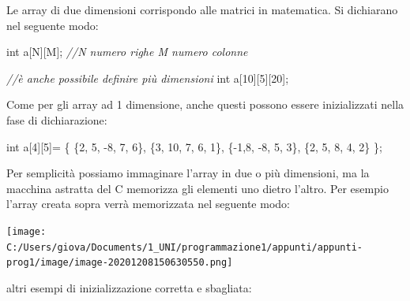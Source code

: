 \documentclass[
  paper=a4,
  oneside  ,captions=tableheading
]{scrbook}
\newenvironment{Shaded}{}{}
\newcommand{\CommentTok}[1]{\textcolor[rgb]{0.38,0.63,0.69}{\textit{#1}}}
\newcommand{\DataTypeTok}[1]{\textcolor[rgb]{0.56,0.13,0.00}{#1}}
\newcommand{\DecValTok}[1]{\textcolor[rgb]{0.25,0.63,0.44}{#1}}
\newcommand{\NormalTok}[1]{#1}
\begin{document}
Le array di due dimensioni corrispondo alle matrici in matematica. Si
dichiarano nel seguente modo:

\begin{Shaded}
\begin{Highlighting}[]
\DataTypeTok{int}\NormalTok{ a[N][M]; }\CommentTok{//N numero righe M numero colonne}

\CommentTok{//è anche possibile definire più dimensioni}
\DataTypeTok{int}\NormalTok{ a[}\DecValTok{10}\NormalTok{][}\DecValTok{5}\NormalTok{][}\DecValTok{20}\NormalTok{];}
\end{Highlighting}
\end{Shaded}

Come per gli array ad 1 dimensione, anche questi possono essere
inizializzati nella fase di dichiarazione:

\begin{Shaded}
\begin{Highlighting}[]
\DataTypeTok{int}\NormalTok{ a[}\DecValTok{4}\NormalTok{][}\DecValTok{5}\NormalTok{]= \{ \{}\DecValTok{2}\NormalTok{, }\DecValTok{5}\NormalTok{, {-}}\DecValTok{8}\NormalTok{, }\DecValTok{7}\NormalTok{, }\DecValTok{6}\NormalTok{\},}
\NormalTok{                \{}\DecValTok{3}\NormalTok{, }\DecValTok{10}\NormalTok{, }\DecValTok{7}\NormalTok{, }\DecValTok{6}\NormalTok{, }\DecValTok{1}\NormalTok{\},}
\NormalTok{                \{{-}}\DecValTok{1}\NormalTok{,}\DecValTok{8}\NormalTok{, {-}}\DecValTok{8}\NormalTok{, }\DecValTok{5}\NormalTok{, }\DecValTok{3}\NormalTok{\},}
\NormalTok{                \{}\DecValTok{2}\NormalTok{, }\DecValTok{5}\NormalTok{, }\DecValTok{8}\NormalTok{, }\DecValTok{4}\NormalTok{, }\DecValTok{2}\NormalTok{\}}
\NormalTok{             \};}
\end{Highlighting}
\end{Shaded}

Per semplicità possiamo immaginare l'array in due o più dimensioni, ma
la macchina astratta del C memorizza gli elementi uno dietro l'altro.
Per esempio l'array creata sopra verrà memorizzata nel seguente modo:

\texttt{[image: C:/Users/giova/Documents/1\_UNI/programmazione1/appunti/appunti-prog1/image/image-20201208150630550.png]}

altri esempi di inizializzazione corretta e sbagliata:
\end{document}
